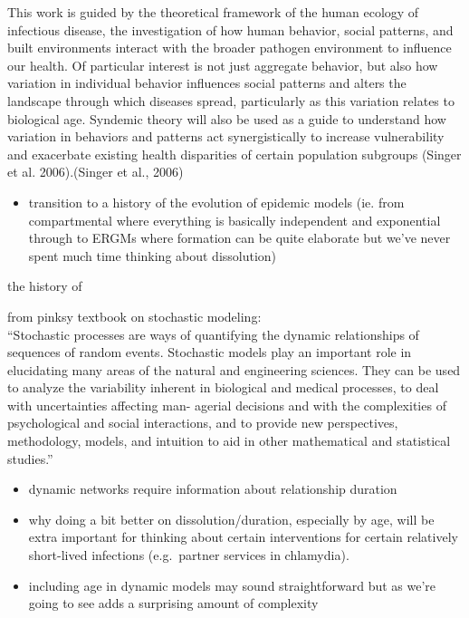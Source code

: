\documentclass [11pt, proquest] {uwthesis}[2015/03/03]
\providecommand{\tightlist}{%
  \setlength{\itemsep}{0pt}\setlength{\parskip}{0pt}}
\begin{document}
This work is guided by the theoretical framework of the human ecology of
infectious disease, the investigation of how human behavior, social
patterns, and built environments interact with the broader pathogen
environment to influence our health. Of particular interest is not just
aggregate behavior, but also how variation in individual behavior
influences social patterns and alters the landscape through which
diseases spread, particularly as this variation relates to biological
age. Syndemic theory will also be used as a guide to understand how
variation in behaviors and patterns act synergistically to increase
vulnerability and exacerbate existing health disparities of certain
population subgroups (Singer et al. 2006).(Singer et al., 2006)
\begin{itemize}
\tightlist
\item
  transition to a history of the evolution of epidemic models (ie. from
  compartmental where everything is basically independent and
  exponential through to ERGMs where formation can be quite elaborate
  but we've never spent much time thinking about dissolution)
\end{itemize}
the history of

from pinksy textbook on stochastic modeling:\\
``Stochastic processes are ways of quantifying the dynamic relationships
of sequences of random events. Stochastic models play an important role
in elucidating many areas of the natural and engineering sciences. They
can be used to analyze the variability inherent in biological and
medical processes, to deal with uncertainties affecting man- agerial
decisions and with the complexities of psychological and social
interactions, and to provide new perspectives, methodology, models, and
intuition to aid in other mathematical and statistical studies.''
\begin{itemize}
\item
  dynamic networks require information about relationship duration
\item
  why doing a bit better on dissolution/duration, especially by age,
  will be extra important for thinking about certain interventions for
  certain relatively short-lived infections (e.g.~partner services in
  chlamydia).
\item
  including age in dynamic models may sound straightforward but as we're
  going to see adds a surprising amount of complexity
\end{itemize}
\end{document}
